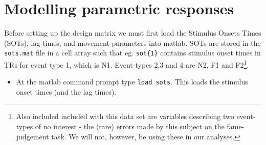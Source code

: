 \documentclass[a4paper,titlepage]{book}
\newcommand{\bi}{\begin{itemize}}
\newcommand{\ei}{\end{itemize}}
\begin{document}
\section{Modelling parametric responses}

Before setting up the design matrix we must first 
load the Stimulus Onsets Times (SOTs), lag times, and movement
parameters into matlab. SOTs are stored in the 
\verb!sots.mat! file in a 
cell array such that eg. \verb!sot{1}! contains 
stimulus onset times in TRs for event type 1, which is N1. Event-types 2,3 and 4 are N2, F1 and F2\footnote{Also included included with this data set are variables describing two event-types of no interest - the (rare) errors made by this subject on the fame-judgement task. 
We will not, however, be using these in our analyses.}.

\bi
\item{At the matlab command prompt type \verb!load sots!. This loads the stimulus onset times (and the lag times).}
\ei
\end{document}
